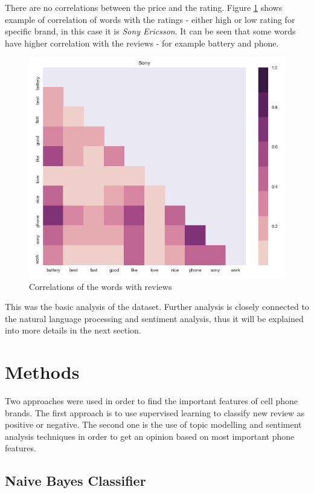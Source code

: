 \documentclass[11pt]{article}
\begin{document}
  There are no correlations between the price and the rating. Figure \ref{fig:correlations} shows example of correlation of words with the ratings - either high or low rating for specific brand, in this case it is \textit{Sony Ericsson}. It can be seen that some words have higher correlation with the reviews - for example battery and phone. 
  
  
  \begin{figure}[h!]
    \centering
      \includegraphics[width=\linewidth]{correlations.png}
    \caption{Correlations of the words with reviews}
    \label{fig:correlations}
  \end{figure}
  
  This was the basic analysis of the dataset. Further analysis is closely connected to the natural language processing and sentiment analysis, thus it will be explained into more details in the next section. 
  
  
  \section{Methods}
  Two approaches were used in order to find the important features of cell phone brands. The first approach is to use supervised learning to classify new review as positive or negative. The second one is the use of topic modelling and sentiment analysis techniques in order to get an opinion based on most important phone features.
  
  
  \subsection{Naive Bayes Classifier}
  
\end{document}

